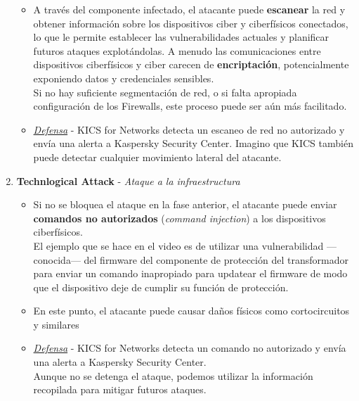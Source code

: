 \begin{enumerate}
   \begin{itemize}
      \item A través del componente infectado, el atacante puede \textbf{escanear} la red y obtener información sobre los dispositivos ciber y ciberfísicos conectados, lo que le permite establecer las vulnerabilidades actuales y planificar futuros ataques explotándolas.
      A menudo las comunicaciones entre dispositivos ciberfísicos y ciber carecen de \textbf{encriptación}, potencialmente exponiendo datos y credenciales sensibles.\\
      Si no hay suficiente segmentación de red, o si falta apropiada configuración de los Firewalls, este proceso puede ser aún más facilitado.
      \item \textit{\ul{Defensa}} - \textsc{KICS} for Networks detecta un escaneo de red no autorizado y envía una alerta a Kaspersky Security Center. Imagino que \textsc{KICS} también puede detectar cualquier movimiento lateral del atacante.
   \end{itemize}
   \item \textbf{Technlogical Attack} - \textit{Ataque a la infraestructura}
   \begin{itemize}
      \item Si no se bloquea el ataque en la fase anterior, el atacante puede enviar \textbf{comandos no autorizados} (\textit{command injection}) a los dispositivos ciberfísicos.\\
      El ejemplo que se hace en el video es de utilizar una vulnerabilidad ---conocida--- del firmware del componente de protección del transformador para enviar un comando inapropiado para updatear el firmware de modo que el dispositivo deje de cumplir su función de protección.

      \item En este punto, el atacante puede causar daños físicos como cortocircuitos y similares
      \item \textit{\ul{Defensa}} - \textsc{KICS} for Networks detecta un comando no autorizado y envía una alerta a Kaspersky Security Center.\\
      Aunque no se detenga el ataque, podemos utilizar la información recopilada para mitigar futuros ataques.
   \end{itemize}
\end{enumerate}

